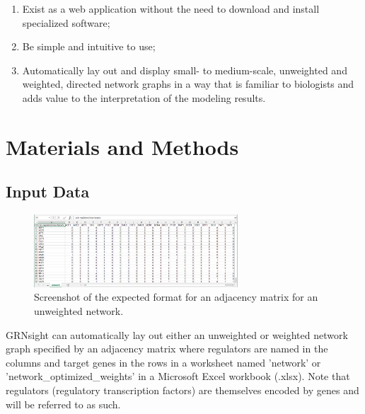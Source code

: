 \documentclass[sigconf,review,anonymous]{acmart}
\begin{document}
\begin{enumerate}
\item Exist as a web application without the need to download and install specialized software;
\item Be simple and intuitive to use;
\item Automatically lay out and display small- to medium-scale, unweighted and weighted, directed network graphs in a way that is familiar to biologists and adds value to the interpretation of the modeling results.
\end{enumerate}

\section{Materials and Methods}

\subsection{Input Data}
\begin{figure}[ht]
  \centering
  \includegraphics[width=3.0in]{Figure1_zoom100.png}
  \caption{Screenshot of the expected format for an adjacency matrix for an unweighted network.}
  \label{fig:Screenshot}
\end{figure}

GRNsight can automatically lay out either an unweighted or weighted network graph specified by an adjacency matrix where regulators are named in the columns and target genes in the rows in a worksheet named 'network' or 'network\_optimized\_weights' in a Microsoft Excel workbook (.xlsx). Note that regulators (regulatory transcription factors) are themselves encoded by genes and will be referred to as such.
\end{document}
